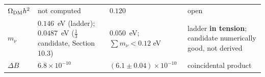 \documentclass[aps,prd,amsmath,amssymb,superscriptaddress,longbibliography,floatfix,preprint]{revtex4-2}
\begin{document}
{\begin{longtable}{llll}
\parbox[c]{2.63cm}{\vspace{2.5pt}\raggedright {} \mbox{$\Omega_{\rm DM}h^2$}\vspace{2.5pt}} & \parbox[c]{4.21cm}{\vspace{2.5pt}\raggedright {} not computed\vspace{2.5pt}} & \parbox[c]{3.01cm}{\vspace{2.5pt}\raggedright {} \mbox{$0.120$} \cite{ref14}\vspace{2.5pt}} & \parbox[c]{4.8cm}{\vspace{2.5pt}\raggedright {} open\vspace{2.5pt}} \\
\hline{}
\parbox[c]{2.63cm}{\vspace{2.5pt}\raggedright {} \mbox{$m_\nu$}\vspace{2.5pt}} & \parbox[c]{4.21cm}{\vspace{2.5pt}\raggedright {} \mbox{$0.146$ eV} (ladder); \mbox{$0.0487$ eV} (\mbox{$\tfrac13$} candidate, Section 10.3)\vspace{2.5pt}} & \parbox[c]{3.01cm}{\vspace{2.5pt}\raggedright {} \mbox{$0.050$ eV}; \mbox{$\sum m_\nu < 0.12$} eV\vspace{2.5pt}} & \parbox[c]{4.8cm}{\vspace{2.5pt}\raggedright {} ladder \textbf{in tension}; candidate numerically good, not derived\vspace{2.5pt}} \\
\hline{}
\parbox[c]{2.63cm}{\vspace{2.5pt}\raggedright {} \mbox{$\Delta B$}\vspace{2.5pt}} & \parbox[c]{4.21cm}{\vspace{2.5pt}\raggedright {} \mbox{$6.8\times10^{-10}$}\vspace{2.5pt}} & \parbox[c]{3.01cm}{\vspace{2.5pt}\raggedright {} $(6.1\pm0.04)\times10^{-10}$\vspace{2.5pt}} & \parbox[c]{4.8cm}{\vspace{2.5pt}\raggedright {} coincidental product\vspace{2.5pt}} \\

\end{longtable}}
\end{document}
